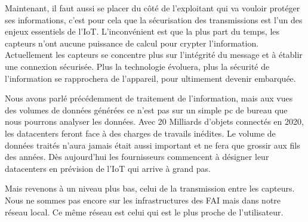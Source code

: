 
Maintenant, il faut aussi se placer du côté de l'exploitant qui va vouloir protéger ses informations, c'est pour cela que la sécurisation des transmissions est l'un des enjeux essentiels de l'IoT. L'inconvénient est que la plus part du temps, les capteurs n'ont aucune puissance de calcul pour crypter l'information. Actuellement les capteurs se concentre plus sur l'intégrité du message et à établir une connexion sécurisée. Plus la technologie évoluera, plus la sécurité de l'information se rapprochera de l'appareil, pour ultimement devenir embarquée. 


Nous avons parlé précédemment de traitement de l'information, mais aux vues des volumes de données générées ce n'est pas sur un simple pc de bureau que nous pourrons analyser les données. Avec 20 Milliards d'objets connectés en 2020, les datacenters feront face à des charges de travails inédites. Le volume de données traités n'aura jamais était aussi important et ne fera que grossir aux fils des années. Dès aujourd'hui les fournisseurs commencent à désigner leur datacenters en prévision de l'IoT qui arrive à grand pas.

Mais revenons à un niveau plus bas, celui de la transmission entre les capteurs. Nous ne sommes pas encore sur les infrastructures des FAI mais dans notre réseau local. Ce même réseau est celui qui est le plus proche de l'utilisateur. 